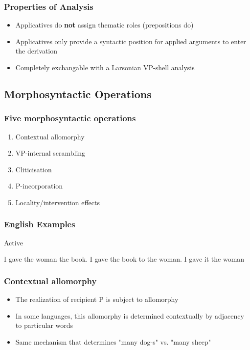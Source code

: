 \documentclass{beamer}
\begin{document}
\begin{frame}
	\frametitle{Properties of Analysis}
	\begin{itemize}
		\item Applicatives do \textbf{not} assign thematic roles (prepositions do)
		\item Applicatives only provide a syntactic position for applied arguments to enter the derivation
		\item Completely exchangable with a Larsonian VP-shell analysis \citep{Larson.1988}
	\end{itemize}
\end{frame}

\subsection{Morphosyntactic Operations}
\begin{frame}
	\frametitle{Five morphosyntactic operations}
	\begin{enumerate}
		\item Contextual allomorphy
		\item VP-internal scrambling
		\item Cliticisation
		\item P-incorporation
		\item Locality/intervention effects
	\end{enumerate}
\end{frame}

\begin{frame}
	\frametitle{English Examples}
\begin{exe}
	\ex Active
	\begin{xlist}
		\ex I gave the woman the book.
		\ex I gave the book to the woman.
		\ex I gave it the woman
	\end{xlist}
\end{exe}
\end{frame}

\begin{frame}
	\frametitle{Contextual allomorphy}
	\begin{itemize}
		\item The realization of recipient P is subject to allomorphy
		\item In some languages, this allomorphy is determined contextually by adjacency to particular words
		\item Same mechanism that determines "many dog-s" vs. "many sheep"
	\end{itemize}
\end{frame}
\end{document}
